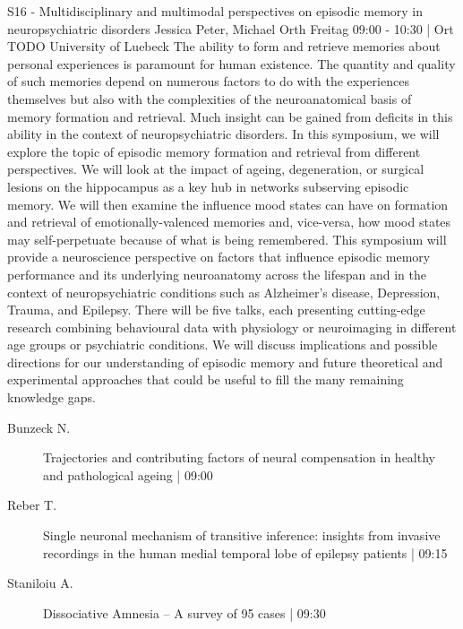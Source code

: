 
            \begin{symposium}
            {S16 - Multidisciplinary and multimodal perspectives on episodic memory in neuropsychiatric disorders}
            {Jessica Peter, Michael Orth }
            {Freitag 09:00 - 10:30 | Ort TODO}
            {University of Luebeck}
            The ability to form and retrieve memories about personal experiences is paramount for human existence. The quantity and quality of such memories depend on numerous factors to do with the experiences themselves but also with the complexities of the neuroanatomical basis of memory formation and retrieval. Much insight can be gained from deficits in this ability in the context of neuropsychiatric disorders. In this symposium, we will explore the topic of episodic memory formation and retrieval from different perspectives. We will look at the impact of ageing, degeneration, or surgical lesions on the hippocampus as a key hub in networks subserving episodic memory. We will then examine the influence mood states can have on formation and retrieval of emotionally-valenced memories and, vice-versa, how mood states may self-perpetuate because of what is being remembered.
This symposium will provide a neuroscience perspective on factors that influence episodic memory performance and its underlying neuroanatomy across the lifespan and in the context of neuropsychiatric conditions such as Alzheimer’s disease, Depression, Trauma, and Epilepsy. There will be five talks, each presenting cutting-edge research combining behavioural data with physiology or neuroimaging in different age groups or psychiatric conditions. We will discuss implications and possible directions for our understanding of episodic memory and future theoretical and experimental approaches that could be useful to fill the many remaining knowledge gaps.
            \begin{description}    
            
                \item [ Bunzeck N.] Trajectories and contributing factors of neural compensation in healthy and pathological ageing \textcolor{mygray}{ | 09:00}    
                
                \item [ Reber T.] Single neuronal mechanism of transitive inference: insights from invasive recordings in the human medial temporal lobe of epilepsy patients \textcolor{mygray}{ | 09:15}    
                
                \item [ Staniloiu A.] Dissociative Amnesia – A survey of 95 cases \textcolor{mygray}{ | 09:30}    
                

\end{description}
\end{symposium}

